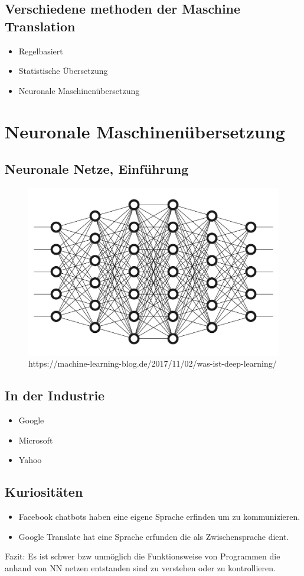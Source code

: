 \documentclass{thesisclass}
\begin{document}
\subsection{Verschiedene methoden der Maschine Translation}
\begin{itemize}
	\item Regelbasiert
	\item Statistische Übersetzung
	\item Neuronale Maschinenübersetzung
\end{itemize}
\newpage
\section{Neuronale Maschinenübersetzung}
\subsection{Neuronale Netze, Einführung}
\begin{figure}[h]
  \includegraphics[width=\linewidth]{images/DeepNeuralNetwork.jpg}
  \caption{https://machine-learning-blog.de/2017/11/02/was-ist-deep-learning/}
  \label{fig:Neuronales Netz}
\end{figure}
\subsection{In der Industrie}
\begin{itemize}
	\item Google
	\item Microsoft
	\item Yahoo
\end{itemize}
\subsection{Kuriositäten}
\begin{itemize}
	\item Facebook chatbots haben eine eigene Sprache erfinden um zu kommunizieren.
	\item Google Translate hat eine Sprache erfunden die als Zwischensprache dient.
\end{itemize}
Fazit: Es ist schwer bzw unmöglich die Funktionsweise von Programmen die anhand von NN netzen entstanden sind zu verstehen oder zu kontrollieren.
\end{document}
